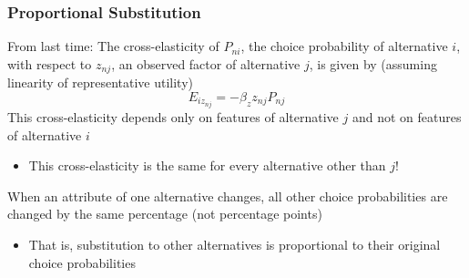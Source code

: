 \documentclass{beamer}\usepackage[]{graphicx}\usepackage[]{color}
\begin{document}
\begin{frame}\frametitle{Proportional Substitution}
    From last time: The cross-elasticity of $P_{ni}$, the choice probability of alternative $i$, with respect to $z_{nj}$, an observed factor of alternative $j$, is given by (assuming linearity of representative utility)
    $$E_{iz_{nj}} = -\beta_z z_{nj} P_{nj}$$
    This cross-elasticity depends only on features of alternative $j$ and not on features of alternative $i$
    \begin{itemize}
    	\item This cross-elasticity is the same for every alternative other than $j$!
    \end{itemize}
    \vspace{2ex}
    When an attribute of one alternative changes, all other choice probabilities are changed by the same percentage (not percentage points)
    \begin{itemize}
    	\item That is, substitution to other alternatives is proportional to their original choice probabilities
    \end{itemize}
\end{frame}
\end{document}
